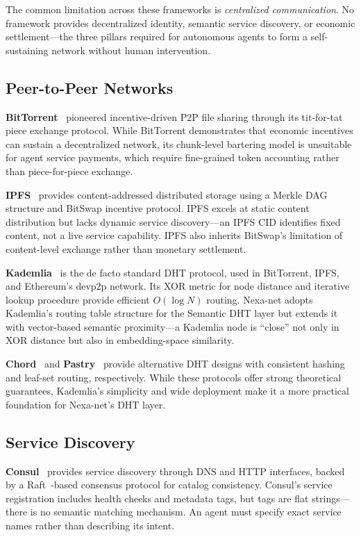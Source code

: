 The common limitation across these frameworks is \emph{centralized communication}. No framework provides decentralized identity, semantic service discovery, or economic settlement---the three pillars required for autonomous agents to form a self-sustaining network without human intervention.

\subsection{Peer-to-Peer Networks}

\textbf{BitTorrent}~\cite{cohen2003bittorrent} pioneered incentive-driven P2P file sharing through its tit-for-tat piece exchange protocol. While BitTorrent demonstrates that economic incentives can sustain a decentralized network, its chunk-level bartering model is unsuitable for agent service payments, which require fine-grained token accounting rather than piece-for-piece exchange.

\textbf{IPFS}~\cite{benet2014ipfs} provides content-addressed distributed storage using a Merkle DAG structure and BitSwap incentive protocol. IPFS excels at static content distribution but lacks dynamic service discovery---an IPFS CID identifies fixed content, not a live service capability. IPFS also inherits BitSwap's limitation of content-level exchange rather than monetary settlement.

\textbf{Kademlia}~\cite{maymounkov2002kademlia} is the de facto standard DHT protocol, used in BitTorrent, IPFS, and Ethereum's devp2p network. Its XOR metric for node distance and iterative lookup procedure provide efficient $O(\log N)$ routing. Nexa-net adopts Kademlia's routing table structure for the Semantic DHT layer but extends it with vector-based semantic proximity---a Kademlia node is ``close'' not only in XOR distance but also in embedding-space similarity.

\textbf{Chord}~\cite{stoica2001chord} and \textbf{Pastry}~\cite{rowstron2001pastry} provide alternative DHT designs with consistent hashing and leaf-set routing, respectively. While these protocols offer strong theoretical guarantees, Kademlia's simplicity and wide deployment make it a more practical foundation for Nexa-net's DHT layer.

\subsection{Service Discovery}

\textbf{Consul}~\cite{consul2015} provides service discovery through DNS and HTTP interfaces, backed by a Raft~\cite{ongaro2014raft}-based consensus protocol for catalog consistency. Consul's service registration includes health checks and metadata tags, but tags are flat strings---there is no semantic matching mechanism. An agent must specify exact service names rather than describing its intent.

